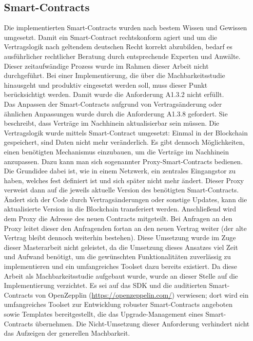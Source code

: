 \subsection{Smart-Contracts}
\label{subsec:implementation:requirements:smart_contracts}
Die implementierten Smart-Contracts wurden nach bestem Wissen und Gewissen umgesetzt. Damit ein Smart-Contract rechtskonform agiert und um die Vertragslogik nach geltendem deutschen Recht korrekt abzubilden, bedarf es ausführlicher rechtlicher Beratung durch entsprechende Experten und Anwälte. Dieser zeitaufwändige Prozess wurde im Rahmen dieser Arbeit nicht durchgeführt. Bei einer Implementierung, die über die Machbarkeitsstudie hinausgeht und produktiv eingesetzt werden soll, muss dieser Punkt berücksichtigt werden. Damit wurde die Anforderung A1.3.2 nicht erfüllt.\\
Das Anpassen der Smart-Contracts aufgrund von Vertragsänderung oder ähnlichen Anpassungen wurde durch die Anforderung A1.3.8 gefordert. Sie beschreibt, dass Verträge im Nachhinein aktualisierbar sein müssen. Die Vertragslogik wurde mittels Smart-Contract umgesetzt: Einmal in der Blockchain gespeichert, sind Daten nicht mehr veränderlich. Es gibt dennoch Möglichkeiten, einen benötigten Mechanismus einzubauen, um die Verträge im Nachhinein anzupassen. Dazu kann man sich sogenannter Proxy-Smart-Contracts bedienen. Die Grundidee dabei ist, wie in einem Netzwerk, ein zentrales Eingangstor zu haben, welches fest definiert ist und sich später nicht mehr ändert. Dieser Proxy verweist dann auf die jeweils aktuelle Version des benötigten Smart-Contracts. Ändert sich der Code durch Vertragsänderungen oder sonstige Updates, kann die aktualisierte Version in die Blockchain transferiert werden. Anschließend wird dem Proxy die Adresse des neuen Contracts mitgeteilt. Bei Anfragen an den Proxy leitet dieser den Anfragenden fortan an den neuen Vertrag weiter (der alte Vertrag bleibt dennoch weiterhin bestehen). Diese Umsetzung wurde im Zuge dieser Masterarbeit nicht geleistet, da die Umsetzung dieses Ansatzes viel Zeit und Aufwand benötigt, um die gewünschten Funktionalitäten zuverlässig zu implementieren und ein umfangreiches Toolset dazu bereits existiert. Da diese Arbeit als Machbarkeitsstudie aufgebaut wurde, wurde an dieser Stelle auf die Implementierung verzichtet. Es sei auf das \ac{SDK} und die auditierten Smart-Contracts von OpenZepplin (\url{https://openzeppelin.com/}) verwiesen; dort wird ein umfangreiches Toolset zur Entwicklung robuster Smart-Contracts angeboten sowie Templates bereitgestellt, die das Upgrade-Management eines Smart-Contracts übernehmen. Die Nicht-Umsetzung dieser Anforderung verhindert nicht das Aufzeigen der generellen Machbarkeit.\\

